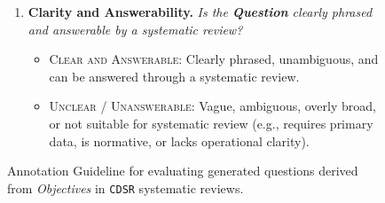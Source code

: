 \documentclass{article}
\begin{document}
\begin{figure}[h!]
\begin{small}
\begin{tcolorbox}[colback=gray!5, colframe=black, width=\textwidth, title=\textbf{Annotation Guideline for Evaluating Generated Questions}, fonttitle=\bfseries]
\begin{enumerate}[leftmargin=0.6cm]
    \vspace{0.5em}
    \item \textbf{Clarity and Answerability.} \textit{Is the \textbf{Question} clearly phrased and answerable by a systematic review?} 
    \vspace{-0.2em}
    \begin{itemize}[leftmargin=0.5cm]
    \item\textsc{Clear and Answerable}: Clearly phrased, unambiguous, and can be answered through a systematic review. 
    \item\textsc{Unclear / Unanswerable}: Vague, ambiguous, overly broad, or not suitable for systematic review (e.g., requires primary data, is normative, or lacks operational clarity).
    \end{itemize}
\end{enumerate}
\end{tcolorbox}
\caption{Annotation Guideline for evaluating generated questions derived from \textit{Objectives} in \texttt{CDSR} systematic reviews.}
\label{fig:annotation_guidelines}
\end{small}
\end{figure}
\end{document}
